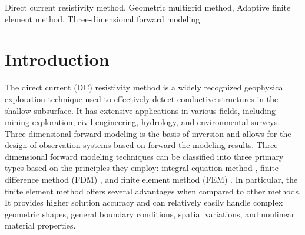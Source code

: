 \documentclass[extra, referee]{gji}
\begin{document}
\begin{abstract}


\end{abstract}

\begin{keywords}
Direct current resistivity method, Geometric multigrid method, Adaptive finite
element method, Three-dimensional forward modeling
\end{keywords}

\section{Introduction}
The direct current (DC) resistivity  method is a widely recognized geophysical
exploration technique used to effectively detect conductive structures in the
shallow subsurface. It has extensive applications in various fields, including
mining exploration, civil engineering, hydrology, and environmental surveys.
Three-dimensional forward modeling is the basis of inversion and allows for the
design of observation systems based on forward the modeling results.
Three-dimensional forward modeling techniques can be classified into three
primary types based on the principles they employ: integral equation method
\citep{Hvodara1998,Mirgalikyzy2015,Huang2022,He2023}, finite difference method
(FDM) \citep{Spitzer1995,Wang2001,Edigbue2023,Yang2023}, and finite element
method (FEM)
\citep{Bibby1978,Li2005,Cai2017,Karaoulis2013,Johnson2017,Laksono2023,Hafsa2023}.
In particular, the finite element method offers several advantages when compared
to other methods. It provides higher solution accuracy and can relatively easily
handle complex geometric shapes, general boundary conditions, spatial
variations, and nonlinear material properties.
\end{document}
